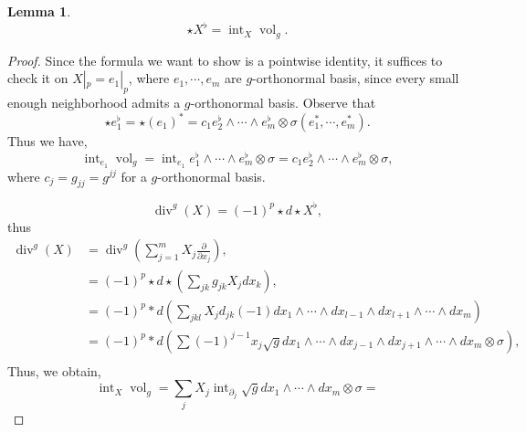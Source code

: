 \documentclass[10pt]{article}
\newtheorem{lemma}{Lemma}[section]
\DeclareMathOperator{\divergence}{div}
\DeclareMathOperator{\interior}{int}
\DeclareMathOperator{\vol}{vol}
\newcommand{\M}[0]{\mathcal{M}}
\newcommand{\cinf}[0]{\mathcal{C}^\infty}
\newcommand{\pd}[2]{{\frac {\partial #1} {\partial #2}}}
\begin{document}
\begin{lemma}
  \begin{equation*}
    \star X^\flat = \interior_X\vol_g.
  \end{equation*}
\end{lemma}
\begin{proof}
  Since the formula we want to show is a pointwise identity, it suffices to check it on $X|_p=e_1|_p$, where $e_1,\cdots,e_m$ are $g$-orthonormal basis, since every small enough neighborhood admits a $g$-orthonormal basis.
Observe that 
\begin{equation*}
  \star e_1^\flat = \star(e_1)^* = c_1e_2^\flat\wedge\cdots\wedge e_m^\flat\otimes\sigma(e_1^*,\cdots,e_m^*).
\end{equation*}
Thus we have,
\begin{equation*}
  \interior_{e_1}\vol_g = \interior_{e_1}e_1^\flat \wedge \cdots\wedge e_m^\flat \otimes \sigma = c_1e_2^\flat \wedge\cdots\wedge e_m^\flat\otimes\sigma,
\end{equation*}
where $c_j = g_{jj}=g^{jj}$ for a $g$-orthonormal basis.

\begin{center}
\end{center}
\begin{equation*}
  \divergence^g(X) = (-1)^p\star d\star X^\flat,
\end{equation*}
thus 
\begin{align*}
  \divergence^g(X) & = \divergence^g\left(\sum_{j=1}^m X_j\pd{}{x_j}\right),\\
  & = (-1)^p\star d \star\left(\sum_{jk} g_{jk}X_jdx_k\right),\\
  &= (-1)^p\ast d\left(\sum_{jkl}X_jd_{jk}(-1) dx_1\wedge\cdots\wedge dx_{l-1}\wedge dx_{l+1}\wedge\cdots\wedge dx_m\right)\\
  & = (-1)^p\ast d\left(\sum(-1)^{j-1}x_j\sqrt{g}dx_1\wedge\cdots\wedge dx_{j-1}\wedge dx_{j+1}\wedge\cdots\wedge dx_m\otimes\sigma\right),\\
\end{align*}
Thus, we obtain,
\begin{equation*}
  \interior_X\vol_g = \sum_{j}X_j\interior_{\partial_j}\sqrt{g}dx_1\wedge\cdots\wedge dx_m\otimes\sigma = 
\end{equation*}
\end{proof}
\end{document}
